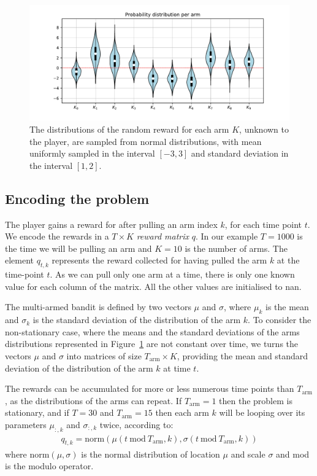 \documentclass[]{scrartcl}
\theoremstyle{definition}
\begin{document}
\begin{figure}[h]
    \hspace{-1.5cm}
    \includegraphics[width=18cm]{figures/initial_distributions.pdf}
    \caption{The distributions of the random reward for each arm $K$, unknown to the player, are sampled from normal distributions, with mean uniformly sampled in the interval $[-3, 3]$ and standard deviation in the interval $[1, 2]$.}
    \label{fig:volin_plot}
\end{figure}

\subsection*{Encoding the problem}
The player gains a reward for after pulling an arm index $k$, for each time point $t$. We encode the rewards in a $T\times K$ \emph{reward matrix} $q$. In our example $T=1000$ is the time we will be pulling an arm and $K=10$ is the number of arms. The element $q_{t, k}$ represents the reward collected for having pulled the arm $k$ at the time-point $t$. As we can pull only one arm at a time, there is only one known value for each column of the matrix. All the other values are initialised to nan.

The multi-armed bandit is defined by two vectors $\mu$ and $\sigma$, where $\mu_k$ is the mean and $\sigma_k$ is the standard deviation of the distribution of the arm $k$.
To consider the non-stationary case, where the means and the standard deviations of the arms distributions represented in Figure~\ref{fig:volin_plot} are not constant over time, we turns the vectors $\mu$ and $\sigma$ into matrices of size $T_{\text{arm}} \times K$, providing the mean and standard deviation of the distribution of the arm $k$ at time $t$.

The rewards can be accumulated for more or less numerous time points than $T_{\text{arm}}$, as the distributions of the arms can repeat. If $T_{\text{arm}}=1$ then the problem is stationary, and if $T=30$ and $T_{\text{arm}}=15$ then each arm $k$ will be looping over its parameters $\mu_{:, k}$ and $\sigma_{:, k}$ twice, according to:
\begin{align*}
q_{t, k}
=
\text{norm}\left(\mu({t~\text{mod}~T_{\text{arm}}, k}), \sigma({t~\text{mod}~T_{\text{arm}}, k})\right)
\end{align*}
where $\text{norm}(\mu, \sigma)$ is the normal distribution of location $\mu$ and scale $\sigma$ and mod is the modulo operator.
\end{document}
